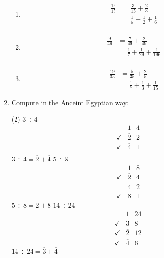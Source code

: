 \documentclass[12pt]{article}
\begin{document}
\begin{enumerate}[label=\arabic*.]
\begin{enumerate}[label=\alph*.]
        \item \begin{align*}
            \frac{13}{15} &= \frac{3}{15} + \frac{2}{3} \\ 
            &= \frac{1}{5} + \frac{1}{2} + \frac{1}{6} \\
        \end{align*}
        \item \begin{align*}
            \frac{9}{49} &= \frac{7}{49} + \frac{2}{49} \\
            &= \frac{1}{7} + \frac{1}{29} + \frac{1}{196} \\
        \end{align*}
        \item \begin{align*}
            \frac{19}{35} &= \frac{5}{35} + \frac{2}{5} \\
            &= \frac{1}{7} + \frac{1}{3} + \frac{1}{15}
        \end{align*}
    \end{enumerate} 
    \item Compute in the Anceint Egyptian way:
    \begin{tasks}[label=\alph*.] (2)
        \task$3 \div 4$
        \begin{align*}
            &1 & 4 \\
            \checkmark&\overline{2} & 2 \\
            \checkmark&\overline{4} &1\\
        \end{align*}
        $3\div 4 = \overline{2} + \overline{4}$
        \task$5 \div 8$
        \begin{align*}
            &1 & 8 \\
            \checkmark&\overline{2} & 4 \\
            &\overline{4} & 2 \\
            \checkmark&\overline{8} & 1
        \end{align*}
        $5 \div 8=\overline{2} + \overline{8}$
        \task$14 \div 24$
        \begin{align*}
            &1 & 24 \\
            \checkmark&\overline{3} & 8\\
            \checkmark&\overline{2} & 12\\
            \checkmark&\overline{4} & 6
        \end{align*}
        $14 \div 24 = \overline{3} + \overline{4}$

\end{tasks}
\end{enumerate}
\end{document}
